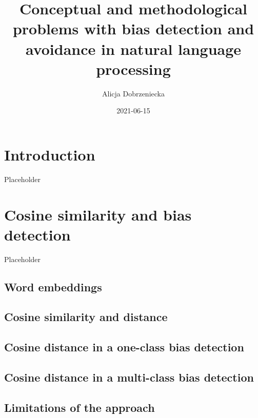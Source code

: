\documentclass[
  12pt,
]{book}
\title{Conceptual and methodological problems with bias detection and avoidance in natural language processing}
\author{Alicja Dobrzeniecka}
\date{2021-06-15}
\begin{document}
\maketitle

{
\setcounter{tocdepth}{5}
\tableofcontents
}
\hypertarget{introduction}{%
\chapter{Introduction}\label{introduction}}

Placeholder

\hypertarget{cosine-similarity-and-bias-detection}{%
\chapter{Cosine similarity and bias detection}\label{cosine-similarity-and-bias-detection}}

Placeholder

\hypertarget{word-embeddings}{%
\section{Word embeddings}\label{word-embeddings}}

\hypertarget{cosine-similarity-and-distance}{%
\section{Cosine similarity and distance}\label{cosine-similarity-and-distance}}

\hypertarget{cosine-distance-in-a-one-class-bias-detection}{%
\section{Cosine distance in a one-class bias detection}\label{cosine-distance-in-a-one-class-bias-detection}}

\hypertarget{cosine-distance-in-a-multi-class-bias-detection}{%
\section{Cosine distance in a multi-class bias detection}\label{cosine-distance-in-a-multi-class-bias-detection}}

\hypertarget{limitations-of-the-approach}{%
\section{Limitations of the approach}\label{limitations-of-the-approach}}
\end{document}
